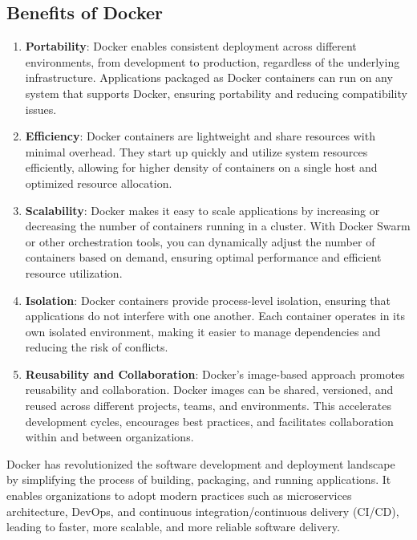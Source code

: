 \subsection*{Benefits of Docker}

\begin{enumerate}

    \item \textbf{Portability}: Docker enables consistent deployment across different environments, from development to production, regardless of the underlying infrastructure. Applications packaged as Docker containers can run on any system that supports Docker, ensuring portability and reducing compatibility issues.

    \item \textbf{Efficiency}: Docker containers are lightweight and share resources with minimal overhead. They start up quickly and utilize system resources efficiently, allowing for higher density of containers on a single host and optimized resource allocation.

    \item \textbf{Scalability}: Docker makes it easy to scale applications by increasing or decreasing the number of containers running in a cluster. With Docker Swarm or other orchestration tools, you can dynamically adjust the number of containers based on demand, ensuring optimal performance and efficient resource utilization.

    \item \textbf{Isolation}: Docker containers provide process-level isolation, ensuring that applications do not interfere with one another. Each container operates in its own isolated environment, making it easier to manage dependencies and reducing the risk of conflicts.

    \item \textbf{Reusability and Collaboration}: Docker's image-based approach promotes reusability and collaboration. Docker images can be shared, versioned, and reused across different projects, teams, and environments. This accelerates development cycles, encourages best practices, and facilitates collaboration within and between organizations.
\end{enumerate}

Docker has revolutionized the software development and deployment landscape by simplifying the process of building, packaging, and running applications. It enables organizations to adopt modern practices such as microservices architecture, DevOps, and continuous integration/continuous delivery (CI/CD), leading to faster, more scalable, and more reliable software delivery.